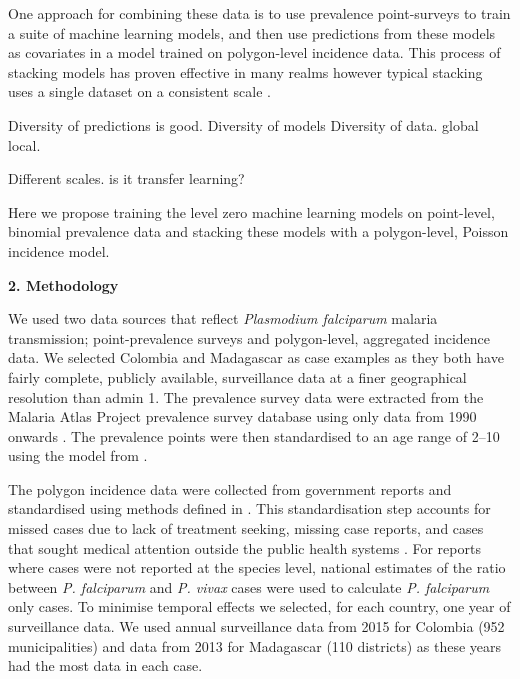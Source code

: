 \documentclass[11pt]{article}
\begin{document}
One approach for combining these data is to use prevalence point-surveys to train a suite of machine learning models, and then use predictions from these models as covariates in a model trained on polygon-level incidence data. 
This process of stacking models has proven effective in many realms however typical stacking uses a single dataset on a consistent scale \citep{sill2009feature, bhatt2017improved}. 

Diversity of predictions is good.
Diversity of models
Diversity of data. global local.

Different scales. is it transfer learning?


Here we propose training the level zero machine learning models on point-level, binomial prevalence data and stacking these models with a polygon-level, Poisson incidence model. 


{\bf 2. Methodology}

We used two data sources that reflect \emph{Plasmodium falciparum} malaria transmission; point-prevalence surveys and polygon-level, aggregated incidence data. 
We selected Colombia and Madagascar as case examples as they both have fairly complete, publicly available, surveillance data at a finer geographical resolution than admin 1.
The prevalence survey data were extracted from the Malaria Atlas Project prevalence survey database using only data from 1990 onwards \citep{bhatt2015effect, guerra2007assembling}.  %
The prevalence points were then standardised to an age range of 2--10 using the model from \citep{smith2007standardizing}.

The polygon incidence data were collected from government reports and standardised using methods defined in \cite{cibulskis2011worldwide}.
This standardisation step accounts for missed cases due to lack of treatment seeking, missing case reports, and cases that sought medical attention outside the public health systems \citep{battle2016treatment}.
For reports where cases were not reported at the species level, national estimates of the ratio between \emph{P. falciparum} and \emph{P. vivax} cases were used to calculate \emph{P. falciparum} only cases. 
To minimise temporal effects we selected, for each country, one year of surveillance data. 
We used annual surveillance data from 2015 for Colombia (952 municipalities) and data from 2013 for Madagascar (110 districts) as these years had the most data in each case.
\end{document}
